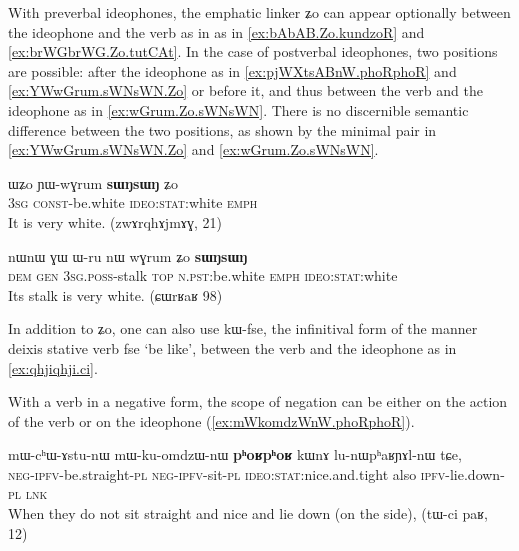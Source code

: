 \documentclass[oldfontcommands,oneside,a4paper,11pt]{article}
\newcommand{\ipa}[1]{{\phon \mbox{#1}}} %
\begin{document}
With preverbal ideophones, the emphatic linker \ipa{ʑo} can appear optionally between the ideophone and the verb as in as in \ref{ex:bAbAB.Zo.kundzoR} and \ref{ex:brWGbrWG.Zo.tutCAt}. In the case of postverbal ideophones, two positions are possible: after the ideophone as in \ref{ex:pjWXtsABnW.phoRphoR} and \ref{ex:YWwGrum.sWNsWN.Zo} or before it, and thus between the verb and the ideophone as in \ref{ex:wGrum.Zo.sWNsWN}. There is no discernible semantic difference between the two positions, as shown by the minimal pair in \ref{ex:YWwGrum.sWNsWN.Zo} and \ref{ex:wGrum.Zo.sWNsWN}.

  \begin{exe}
\ex \label{ex:YWwGrum.sWNsWN.Zo}
\gll 
 \ipa{ɯʑo}  	\ipa{ɲɯ-wɣrum}  	\ipa{\textbf{sɯŋsɯŋ}}  	\ipa{ʑo}  \\
\textsc{3sg} \textsc{const}-be.white \textsc{ideo:stat}:white  \textsc{emph} \\
\glt It is very white. (zwɤrqhɤjmɤɣ, 21)
\end{exe}
 \begin{exe}
\ex \label{ex:wGrum.Zo.sWNsWN}
\gll 
\ipa{nɯnɯ}  	\ipa{ɣɯ}  	\ipa{ɯ-ru}  	\ipa{nɯ}  	\ipa{wɣrum}  	\ipa{ʑo}  	\ipa{\textbf{sɯŋsɯŋ}}  \\
\textsc{dem} \textsc{gen} \textsc{3sg.poss}-stalk \textsc{top} \textsc{n.pst}:be.white \textsc{emph} \textsc{ideo:stat}:white \\
\glt Its stalk is very white. (ɕɯrʁaʁ 98)
\end{exe}

In addition to \ipa{ʑo}, one can also use \ipa{kɯ-fse}, the infinitival  form  of the manner deixis stative verb \ipa{fse} `be like', between the verb and the ideophone as in \ref{ex:qhjiqhji.ci}.



With a verb in a negative form, the scope of  negation can be either on the action of the verb or on the ideophone (\ref{ex:mWkomdzWnW.phoRphoR}).

 \begin{exe}
\ex \label{ex:mWkomdzWnW.phoRphoR}
\gll 
 \ipa{mɯ-cʰɯ-ɤstu-nɯ} 	\ipa{mɯ-ku-omdzɯ-nɯ} 	\ipa{\textbf{pʰoʁpʰoʁ}} 	\ipa{kɯnɤ} 	\ipa{lu-nɯpʰaʁɲɤl-nɯ} 	\ipa{tɕe,} \\
\textsc{neg-ipfv}-be.straight-\textsc{pl} \textsc{neg-ipfv}-sit-\textsc{pl} \textsc{ideo:stat}:nice.and.tight
also \textsc{ipfv}-lie.down-\textsc{pl} \textsc{lnk} \\
\glt When they do not sit straight and nice and   lie down (on the side), (tɯ-ci paʁ, 12)
\end{exe}
\end{document}
